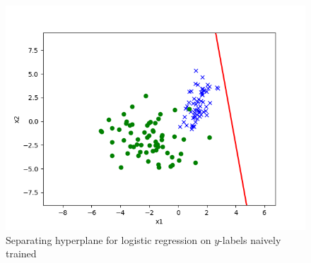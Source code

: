\begin{answer}
	\begin{figure}[H]
		\centering
		\vspace{-2mm}
		\includegraphics[width=0.65\linewidth]{../src/posonly/posonly_naive_pred.png}
	\caption{Separating hyperplane for logistic regression on $y$-labels naively trained}

	\end{figure}

\end{answer}

